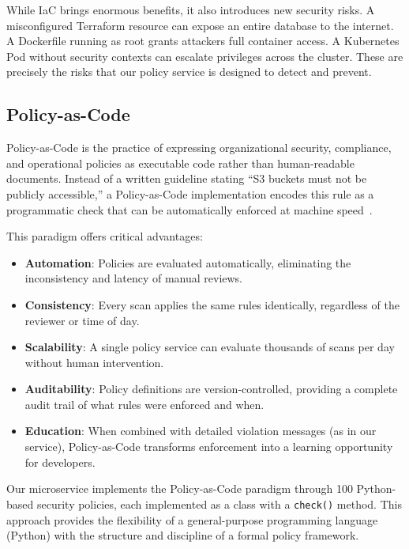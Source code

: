 \noindent While IaC brings enormous benefits, it also introduces new security risks. A misconfigured Terraform resource can expose an entire database to the internet. A Dockerfile running as root grants attackers full container access. A Kubernetes Pod without security contexts can escalate privileges across the cluster. These are precisely the risks that our policy service is designed to detect and prevent.

\subsection{Policy-as-Code}

Policy-as-Code is the practice of expressing organizational security, compliance, and operational policies as executable code rather than human-readable documents. Instead of a written guideline stating ``S3 buckets must not be publicly accessible,'' a Policy-as-Code implementation encodes this rule as a programmatic check that can be automatically enforced at machine speed~\cite{opa}.

This paradigm offers critical advantages:

\begin{itemize}
    \item \textbf{Automation}: Policies are evaluated automatically, eliminating the inconsistency and latency of manual reviews.
    \item \textbf{Consistency}: Every scan applies the same rules identically, regardless of the reviewer or time of day.
    \item \textbf{Scalability}: A single policy service can evaluate thousands of scans per day without human intervention.
    \item \textbf{Auditability}: Policy definitions are version-controlled, providing a complete audit trail of what rules were enforced and when.
    \item \textbf{Education}: When combined with detailed violation messages (as in our service), Policy-as-Code transforms enforcement into a learning opportunity for developers.
\end{itemize}

\noindent Our microservice implements the Policy-as-Code paradigm through 100 Python-based security policies, each implemented as a class with a \texttt{check()} method. This approach provides the flexibility of a general-purpose programming language (Python) with the structure and discipline of a formal policy framework.

